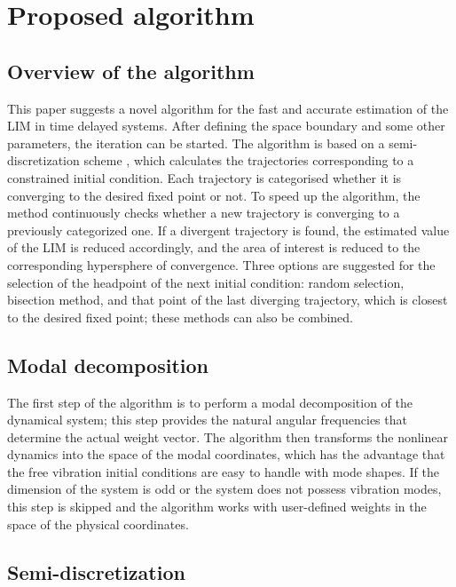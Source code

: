 \documentclass[preprint,12pt]{elsarticle}
\begin{document}
	\section{Proposed algorithm}\label{sec:algorithm}
	
	\subsection{Overview of the algorithm}\label{sec:iterativeproc}
	This paper suggests a novel algorithm for the fast and accurate estimation of the LIM in time delayed systems. After defining the space boundary and some other parameters, the iteration can be started. The algorithm is based on a semi-discretization scheme \cite{insperger2011semi}, which calculates the trajectories corresponding to a constrained initial condition. Each trajectory is categorised whether it is converging to the desired fixed point or not. To speed up the algorithm, the method continuously checks whether a new trajectory is converging to a previously categorized one. If a divergent trajectory is found, the estimated value of the LIM is reduced accordingly, and the area of interest is reduced to the corresponding hypersphere of convergence. Three options are suggested for the selection of the headpoint of the next initial condition: random selection, bisection method, and that point of the last diverging trajectory, which is closest to the desired fixed point; these methods can also be combined. 
	
	\subsection{Modal decomposition}
	The first step of the algorithm is to perform a modal decomposition of the dynamical system; this step provides the natural angular frequencies that determine the actual weight vector. The algorithm then transforms the nonlinear dynamics into the space of the modal coordinates, which has the advantage that the free vibration initial conditions are easy to handle with mode shapes. If the dimension of the system is odd or the system does not possess vibration modes, this step is skipped and the algorithm works with user-defined weights in the space of the physical coordinates.
	
	\subsection{Semi-discretization}
	
\end{document}

